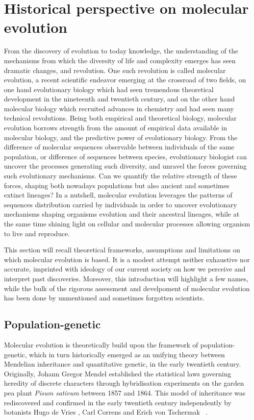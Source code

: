 \thispagestyle{empty}
\chapter{Historical perspective on molecular evolution}
{
	\hypersetup{linkcolor=GREYDARK}
	\minitoc
}

\label{sec:intro-historical}

From the discovery of evolution to today knowledge, the understanding of the mechanisms from which the diversity of life and complexity emerges has seen dramatic changes, and revolution.
One such revolution is called molecular evolution, a recent scientific endeavor emerging at the crossroad of two fields, on one hand evolutionary biology which had seen tremendous theoretical development in the nineteenth and twentieth century, and on the other hand molecular biology which recruited advances in chemistry and had seen many technical revolutions.
Being both empirical and theoretical biology, molecular evolution borrows strength from the amount of empirical data available in molecular biology, and the predictive power of evolutionary biology.
From the difference of molecular sequences observable between individuals of the same population, or difference of sequences between species, evolutionary biologist can uncover the processes generating such diversity, and unravel the forces governing such evolutionary mechanisms.
Can we quantify the relative strength of these forces, shaping both nowadays populations but also ancient and sometimes extinct lineages?
In a nutshell, molecular evolution leverages the patterns of sequences distribution carried by individuals in order to uncover evolutionary mechanisms shaping organisms evolution and their ancestral lineages, while at the same time shining light on cellular and molecular processes allowing organism to live and reproduce.

This section will recall theoretical frameworks, assumptions and limitations on which molecular evolution is based.
It is a modest attempt neither exhaustive nor accurate, imprinted with ideology of our current society on how we perceive and interpret past discoveries.
Moreover, this introduction will highlight a few names, while the bulk of the rigorous assessment and develpoment of molecular evolution has been done by unmentioned and sometimes forgotten scientists.

\section{Population-genetic}
Molecular evolution is theoretically build upon the framework of population-genetic, which in turn historically emerged as an unifying theory between Mendelian inheritance and quantitative genetic, in the early twentieth century.
Originally,
Johann Gregor Mendel%
 established the statistical laws governing heredity of discrete characters through  hybridisation experiments on the garden pea plant \textit{Pisum sativum} between 1857 and 1864.
This model of inheritance was rediscovered and confirmed in the early twentieth century independently by botanists
Hugo de Vries%
, Carl Correns%
 and Erich von Tschermak%
 ~\citep{dunn2003gregor}.

